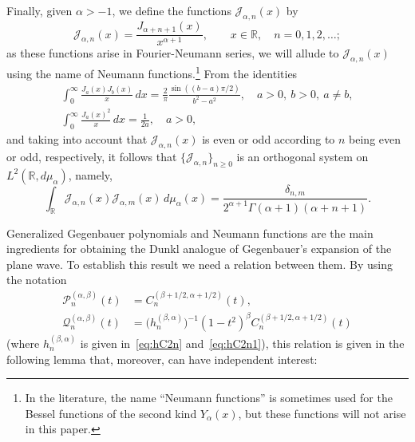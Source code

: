 \documentclass[11pt,a4paper]{amsart}
\theoremstyle{plain}
\theoremstyle{definition}
\newcommand{\R}{\mathbb{R}}
\newcommand{\calJ}{\mathcal{J}}
\newcommand{\calP}{\mathcal{P}}
\newcommand{\calQ}{\mathcal{Q}}
\begin{document}
Finally, given $\alpha>-1$, we define the functions $\calJ_{\alpha,n}(x)$ by 
\begin{equation*}
  \calJ_{\alpha,n}(x) = \frac{J_{\alpha+n+1}(x)}{x^{\alpha+1}},
  \qquad x \in \R,
  \quad n = 0,1,2,\dots;
\end{equation*}
as these functions arise in Fourier-Neumann series, we will allude to 
$\calJ_{\alpha,n}(x)$ using the name of Neumann functions.\footnote{In the literature, 
the name ``Neumann functions'' is sometimes used for the Bessel functions of the 
second kind $Y_\alpha(x)$, but these functions will not arise in this paper.}
From the identities
\begin{gather*}
  \int_0^{\infty} \frac{J_a(x) J_b(x)}{x}\,dx
  = \frac{2}{\pi} \frac{\sin((b-a)\pi/2)}{b^2-a^2},
  \quad a>0,\ b>0,\ a \ne b,
  \\
  \int_0^{\infty} \frac{J_a(x)^2}{x}\,dx
  = \frac{1}{2a}, \quad a > 0,
\end{gather*}
and taking into account that $\calJ_{\alpha,n}(x)$ is even or odd
according to $n$ being even or odd, respectively, it follows that
$\{\calJ_{\alpha,n}\}_{n\ge0}$ is an orthogonal system on
$L^2(\R,d\mu_\alpha)$, namely,
\begin{equation*}
  \int_{\R} \calJ_{\alpha,n}(x) \calJ_{\alpha,m}(x)
  \, d\mu_{\alpha}(x) = \frac{\delta_{n,m}}{2^{\alpha+1}\Gamma(\alpha+1)(\alpha+n+1)}.
\end{equation*}

Generalized Gegenbauer polynomials and Neumann functions are the
main ingredients for obtaining the Dunkl analogue of Gegenbauer's expansion of the plane wave. 
To establish this result we need a relation between them. By using the notation
\begin{align}
\label{eq:calP}
  \calP^{(\alpha,\beta)}_n(t)
    &= C_n^{(\beta+1/2,\alpha+1/2)}(t),\\
\label{eq:calQ}
  \calQ^{(\alpha,\beta)}_n(t)
    &= \big(h_n^{(\beta,\alpha)}\big)^{-1} (1-t^2)^\beta C_n^{(\beta+1/2,\alpha+1/2)}(t)
\end{align}
(where $h_n^{(\beta,\alpha)}$ is given in~\eqref{eq:hC2n} and~\eqref{eq:hC2n1}),
this relation is given in the following lemma that, moreover,
can have independent interest:
\end{document}
